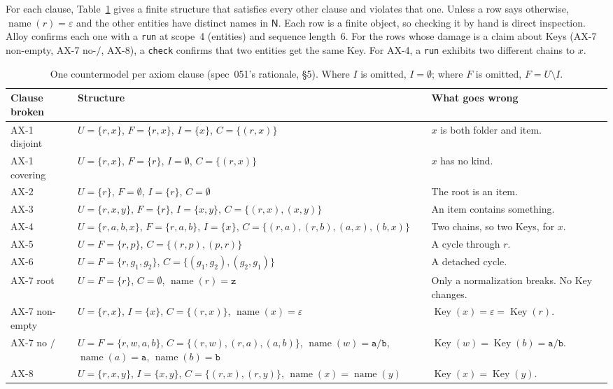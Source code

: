 \documentclass[11pt,a4paper]{article}
\newcommand{\sep}{\mathord{/}}              %
\newcommand{\eps}{\varepsilon}
\newcommand{\N}{\mathsf{N}}                 %
\newcommand{\U}{U}
\newcommand{\F}{F}
\newcommand{\I}{I}
\newcommand{\nm}{\operatorname{name}}
\newcommand{\Key}{\operatorname{Key}}
\theoremstyle{plain}
\theoremstyle{definition}
\theoremstyle{remark}
\begin{document}
For each clause, Table~\ref{tab:rows} gives a finite structure that satisfies
every other clause and violates that one. Unless a row says otherwise,
$\nm(r)=\eps$ and the other entities have distinct names in $\N$. Each row is
a finite object, so checking it by hand is direct inspection. Alloy confirms
each one with a \texttt{run} at scope~4 (entities) and sequence length~6. For
the rows whose damage is a claim about Keys (AX-7 non-empty, AX-7 no-$\sep$,
AX-8), a \texttt{check} confirms that two entities get the same Key. For AX-4,
a \texttt{run} exhibits two different chains to $x$.

\begin{table}[ht]
\centering
\small
\renewcommand{\arraystretch}{1.25}
\begin{tabularx}{\textwidth}{@{}l>{\raggedright\arraybackslash}X>{\raggedright\arraybackslash}X@{}}
\toprule
Clause broken & Structure & What goes wrong \\
\midrule
AX-1 disjoint & $\U=\{r,x\}$, $\F=\{r,x\}$, $\I=\{x\}$, $C=\{(r,x)\}$ & $x$ is both folder and item. \\
AX-1 covering & $\U=\{r,x\}$, $\F=\{r\}$, $\I=\emptyset$, $C=\{(r,x)\}$ & $x$ has no kind. \\
AX-2 & $\U=\{r\}$, $\F=\emptyset$, $\I=\{r\}$, $C=\emptyset$ & The root is an item. \\
AX-3 & $\U=\{r,x,y\}$, $\F=\{r\}$, $\I=\{x,y\}$, $C=\{(r,x),(x,y)\}$ & An item contains something. \\
AX-4 & $\U=\{r,a,b,x\}$, $\F=\{r,a,b\}$, $\I=\{x\}$, $C=\{(r,a),(r,b),(a,x),(b,x)\}$ & Two chains, so two Keys, for $x$. \\
AX-5 & $\U=\F=\{r,p\}$, $C=\{(r,p),(p,r)\}$ & A cycle through $r$. \\
AX-6 & $\U=\F=\{r,g_1,g_2\}$, $C=\{(g_1,g_2),(g_2,g_1)\}$ & A detached cycle. \\
AX-7 root & $\U=\F=\{r\}$, $C=\emptyset$, $\nm(r)=\texttt{z}$ & Only a normalization breaks. No Key changes. \\
AX-7 non-empty & $\U=\{r,x\}$, $\I=\{x\}$, $C=\{(r,x)\}$, $\nm(x)=\eps$ & $\Key(x)=\eps=\Key(r)$. \\
AX-7 no $\sep$ & $\U=\F=\{r,w,a,b\}$, $C=\{(r,w),(r,a),(a,b)\}$, $\nm(w)=\texttt{a/b}$, $\nm(a)=\texttt{a}$, $\nm(b)=\texttt{b}$ & $\Key(w)=\Key(b)=\texttt{a/b}$. \\
AX-8 & $\U=\{r,x,y\}$, $\I=\{x,y\}$, $C=\{(r,x),(r,y)\}$, $\nm(x)=\nm(y)$ & $\Key(x)=\Key(y)$. \\
\bottomrule
\end{tabularx}
\caption{One countermodel per axiom clause (spec~051's rationale, \S5).
Where $\I$ is omitted, $\I=\emptyset$; where $\F$ is omitted,
$\F=\U\setminus\I$.}
\label{tab:rows}
\end{table}
\end{document}
